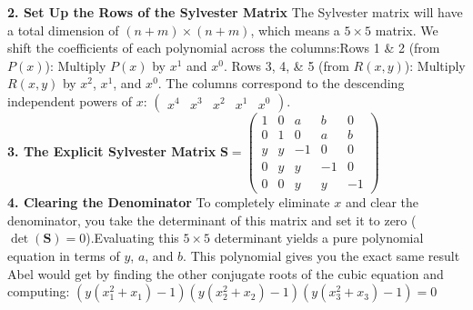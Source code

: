 {\bf 2. Set Up the Rows of the Sylvester Matrix}
The Sylvester matrix will have a total dimension of \((n + m) \times (n + m)\), which means a \(5 \times 5\) matrix. 
We shift the coefficients of each polynomial across the columns:Rows 1 \& 2 (from \(P(x)\)): Multiply \(P(x)\) by \(x^{1}\) and \(x^{0}\).
Rows 3, 4, \& 5 (from \(R(x,y)\)): Multiply \(R(x,y)\) by \(x^{2}\), \(x^{1}\), and \(x^{0}\).
The columns correspond to the descending independent powers of \(x\): \(\left(\begin{matrix}x^{4}&x^{3}&x^{2}&x^{1}&x^{0}\end{matrix}\right)\). \\

{\bf 3. The Explicit Sylvester Matrix}
\(\mathbf{S}=\left(\begin{matrix}1&0&a&b&0\\ 0&1&0&a&b\\ y&y&-1&0&0\\ 0&y&y&-1&0\\ 0&0&y&y&-1\end{matrix}\right)\) \\

{\bf 4. Clearing the Denominator}
To completely eliminate \(x\) and clear the denominator, you take the determinant of this matrix and set it to zero (\(\det(\mathbf{S}) = 0\)).Evaluating this \(5 \times 5\) determinant 
yields a pure polynomial equation in terms of \(y\), \(a\), and \(b\). 
This polynomial gives you the exact same result Abel would get by finding the other conjugate roots of the cubic equation and computing:
\((y(x_{1}^{2}+x_{1})-1)(y(x_{2}^{2}+x_{2})-1)(y(x_{3}^{2}+x_{3})-1)=0\)
